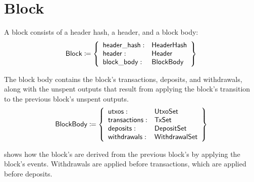 \documentclass[../midgard.tex]{subfiles}
\begin{document}
\section{Block}
\label{h:block}

A block consists of a header hash, a header, and a block body:
\begin{equation*}
    \mathsf{Block} \coloneq \left\{
    \begin{array}{ll}
        \mathsf{header\_hash} : & \mathsf{HeaderHash} \\
        \mathsf{header} : & \mathsf{Header} \\
        \mathsf{block\_body} : & \mathsf{BlockBody}
    \end{array} \right\}
\end{equation*}

The block body contains the block's transactions, deposits, and withdrawals, along with
the unspent outputs that result from applying the block's transition to the previous block's unspent outputs.
\begin{equation*}
    \mathsf{BlockBody} \coloneq \left\{
    \begin{array}{ll}
        \mathsf{utxos} : & \mathsf{UtxoSet} \\
        \mathsf{transactions} : & \mathsf{TxSet} \\
        \mathsf{deposits} : & \mathsf{DepositSet} \\
        \mathsf{withdrawals} : & \mathsf{WithdrawalSet} \\
    \end{array} \right\}
\end{equation*}

 shows how the block's  are derived from the previous block's  by applying the block's events.
Withdrawals are applied before transactions, which are applied before deposits.
\end{document}
